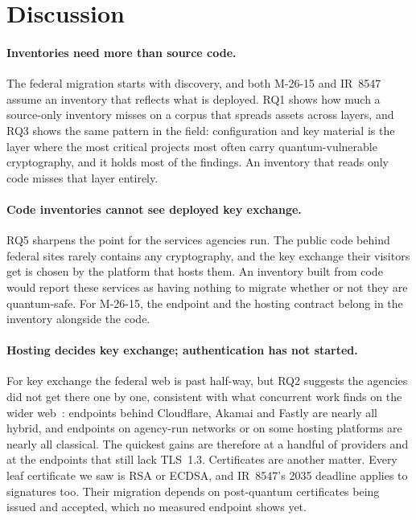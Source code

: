 \section{Discussion}
\label{sec:discussion}

\paragraph{Inventories need more than source code.} The federal migration
starts with discovery, and both M-26-15 and IR~8547 assume an inventory that
reflects what is deployed. RQ1 shows how much a source-only inventory misses
on a corpus that spreads assets across layers, and RQ3 shows the same pattern
in the field: configuration and key material is the layer where the most
critical projects most often carry quantum-vulnerable cryptography, and it
holds most of the findings. An inventory that reads only code misses that
layer entirely.

\paragraph{Code inventories cannot see deployed key exchange.} RQ5 sharpens
the point for the services agencies run. The public code behind federal sites
rarely contains any cryptography, and the key exchange their visitors get is
chosen by the platform that hosts them. An inventory built from code would
report these services as having nothing to migrate whether or not they are
quantum-safe. For M-26-15, the endpoint and the hosting contract belong in the
inventory alongside the code.

\paragraph{Hosting decides key exchange; authentication has not started.}
For key exchange the federal web is past half-way, but RQ2 suggests the
agencies did not get there one by one, consistent with what concurrent work
finds on the wider web~\cite{wickramasinghe2026,loizou2026}: endpoints behind Cloudflare, Akamai
and Fastly are nearly all hybrid, and endpoints on agency-run networks or on
some hosting platforms are nearly all classical. The quickest gains are
therefore at a handful of providers and at the 
endpoints that still lack TLS~1.3. Certificates are another matter. Every
leaf certificate we saw is RSA or ECDSA, and IR~8547's 2035 deadline applies
to signatures too. Their migration depends on post-quantum certificates being
issued and accepted, which no measured endpoint shows yet.

